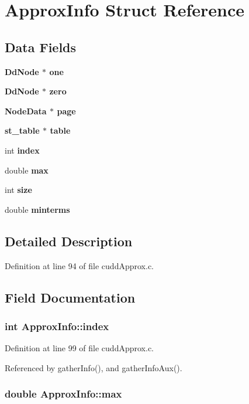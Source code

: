 \section{Approx\-Info Struct Reference}
\label{structApproxInfo}
\subsection*{Data Fields}
\begin{CompactItemize}
\item 
\bf{Dd\-Node} $\ast$ \bf{one}
\item 
\bf{Dd\-Node} $\ast$ \bf{zero}
\item 
\bf{Node\-Data} $\ast$ \bf{page}
\item 
\bf{st\_\-table} $\ast$ \bf{table}
\item 
int \bf{index}
\item 
double \bf{max}
\item 
int \bf{size}
\item 
double \bf{minterms}
\end{CompactItemize}


\subsection{Detailed Description}




Definition at line 94 of file cudd\-Approx.c.

\subsection{Field Documentation}
\subsubsection{\setlength{\rightskip}{0pt plus 5cm}int \bf{Approx\-Info::index}}\label{structApproxInfo_b2b6efcd571f403594bf0f1b1dfed1b3}




Definition at line 99 of file cudd\-Approx.c.

Referenced by gather\-Info(), and gather\-Info\-Aux().
\subsubsection{\setlength{\rightskip}{0pt plus 5cm}double \bf{Approx\-Info::max}}\label{structApproxInfo_46d5a4e8c0c842697fd256fd57471245}




